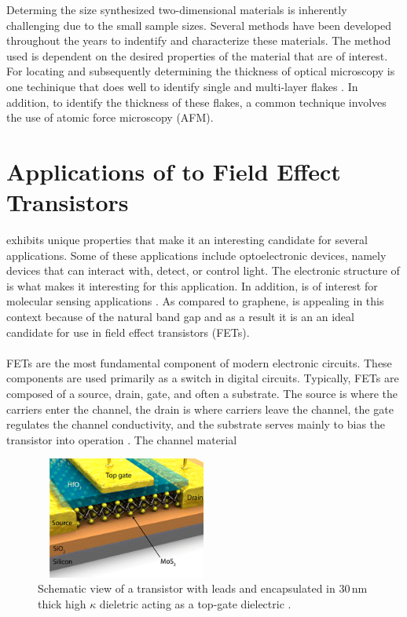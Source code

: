 \documentclass[%
 reprint,
 amsmath,amssymb,
 aps,
pra,
floatfix,
]{revtex4-1}
\begin{document}
Determing the size synthesized two-dimensional materials is inherently challenging due to the small sample sizes. Several methods have been developed throughout the years to indentify and characterize these materials. The method used is dependent on the desired properties of the material that are of interest. For locating and subsequently determining the thickness of  optical microscopy is one techinique that does well to identify single and multi-layer flakes \cite{acsnanoReview2013}. In addition, to identify the thickness of these flakes, a common technique involves the use of atomic force microscopy (AFM).

\section{\label{sec:mos2_applications} Applications of  to Field Effect Transistors}
 exhibits unique properties that make it an interesting candidate for several applications. Some of these applications include optoelectronic devices, namely devices that can interact with, detect, or control light. The electronic structure of  is what makes it interesting for this application. In addition,  is of interest for molecular sensing applications \cite{Wang2012a}. As compared to graphene,  is appealing in this context because of the natural band gap and as a result it is an an ideal candidate for use in field effect transistors (FETs). \\ \\
FETs are the most fundamental component of modern electronic circuits. These components are used primarily as a switch in digital circuits. Typically, FETs are composed of a source, drain, gate, and often a substrate. The source is where the carriers enter the channel, the drain is where carriers leave the channel, the gate regulates the channel conductivity, and the substrate serves mainly to bias the transistor into operation \cite{Millman1991}. The channel material
\begin{figure}
\includegraphics[width=6cm,height=4cm]{../figs/mos2fet}
\caption{Schematic view of a  transistor with  leads and encapsulated in $30 \mathrm{\,nm}$ thick high $\kappa$ dieletric  acting as a top-gate dielectric \cite{Kis2011, Lembke2015}.}
\label{fig:mos2fet}
\end{figure}
\end{document}
